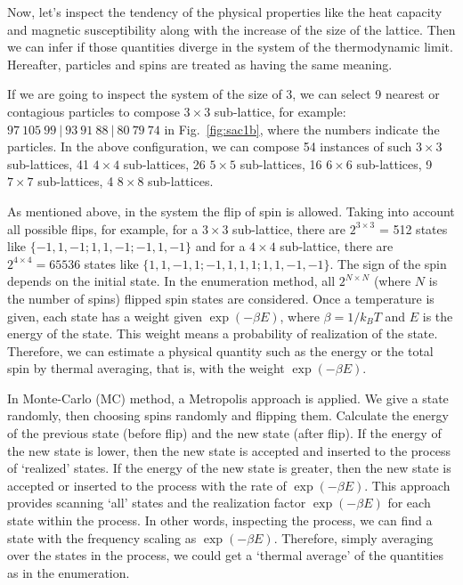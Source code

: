 \documentclass[
    aps,
    prb,
    reprint,           %
    superscriptaddress,%
    amsmath,amssymb,
    floatfix
]{revtex4-2}
\begin{document}
Now, let's inspect the tendency of the physical properties like the heat capacity and magnetic susceptibility along with the increase of the size of the lattice. Then we can infer if those quantities diverge in the system of the thermodynamic limit. Hereafter, particles and spins are treated as having the same meaning.

If we are going to inspect the system of the size of 3, we can select 9 nearest or contagious particles to compose $3\times3$ sub-lattice, for example: $97\ 105\ 99\ |\ 93\ 91\ 88\ |\ 80\ 79\ 74$ in Fig.~\ref{fig:sac1b}, where the numbers indicate the particles. In the above configuration, we can compose 54 instances of such $3\times3$ sub-lattices, 41 $4\times4$ sub-lattices, 26 $5\times5$ sub-lattices, 16 $6\times6$ sub-lattices, 9 $7\times7$ sub-lattices, 4 $8\times8$ sub-lattices.

As mentioned above, in the system the flip of spin is allowed. Taking into account all possible flips, for example, for a $3\times3$ sub-lattice, there are $2^{3\times3}$ = 512 states like $\{-1, 1, -1; 1, 1, -1; -1, 1, -1\}$ and for a $4\times4$ sub-lattice, there are $2^{4\times4} = 65536$ states like $\{1, 1, -1, 1; -1, 1, 1, 1; 1, 1, -1, -1\}$. The sign of the spin depends on the initial state. In the enumeration method, all $2^{N\times N}$ (where $N$ is the number of spins) flipped spin states are considered. Once a temperature is given, each state has a weight given $\exp(-\beta E)$, where $\beta = 1/k_BT$ and $E$ is the energy of the state. This weight means a probability of realization of the state. Therefore, we can estimate a physical quantity such as the energy or the total spin by thermal averaging, that is, with the weight $\exp(-\beta E)$. 

In Monte-Carlo (MC) method, a Metropolis approach is applied. We give a state randomly, then choosing spins randomly and flipping them. Calculate the energy of the previous state (before flip) and the new state (after flip). If the energy of the new state is lower, then the new state is accepted and inserted to the process of `realized' states. If the energy of the new state is greater, then the new state is accepted or inserted to the process with the rate of $\exp(-\beta E)$. This approach provides scanning `all' states and the realization factor $\exp(-\beta E)$ for each state within the process. In other words, inspecting the process, we can find a state with the frequency scaling as $\exp(-\beta E)$. Therefore, simply averaging over the states in the process, we could get a `thermal average' of the quantities as in the enumeration.
\end{document}
